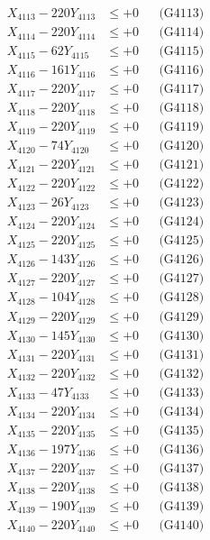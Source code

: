 \documentclass[a4paper,10pt]{article}
\begin{document}
{\begin{align}
X_{4113} - 220Y_{4113} &\leq +0 && \text{(G4113)} \\
X_{4114} - 220Y_{4114} &\leq +0 && \text{(G4114)} \\
X_{4115} - 62Y_{4115} &\leq +0 && \text{(G4115)} \\
X_{4116} - 161Y_{4116} &\leq +0 && \text{(G4116)} \\
X_{4117} - 220Y_{4117} &\leq +0 && \text{(G4117)} \\
X_{4118} - 220Y_{4118} &\leq +0 && \text{(G4118)} \\
X_{4119} - 220Y_{4119} &\leq +0 && \text{(G4119)} \\
X_{4120} - 74Y_{4120} &\leq +0 && \text{(G4120)} \\
\allowbreak
X_{4121} - 220Y_{4121} &\leq +0 && \text{(G4121)} \\
X_{4122} - 220Y_{4122} &\leq +0 && \text{(G4122)} \\
X_{4123} - 26Y_{4123} &\leq +0 && \text{(G4123)} \\
X_{4124} - 220Y_{4124} &\leq +0 && \text{(G4124)} \\
X_{4125} - 220Y_{4125} &\leq +0 && \text{(G4125)} \\
X_{4126} - 143Y_{4126} &\leq +0 && \text{(G4126)} \\
X_{4127} - 220Y_{4127} &\leq +0 && \text{(G4127)} \\
X_{4128} - 104Y_{4128} &\leq +0 && \text{(G4128)} \\
X_{4129} - 220Y_{4129} &\leq +0 && \text{(G4129)} \\
X_{4130} - 145Y_{4130} &\leq +0 && \text{(G4130)} \\
\allowbreak
X_{4131} - 220Y_{4131} &\leq +0 && \text{(G4131)} \\
X_{4132} - 220Y_{4132} &\leq +0 && \text{(G4132)} \\
X_{4133} - 47Y_{4133} &\leq +0 && \text{(G4133)} \\
X_{4134} - 220Y_{4134} &\leq +0 && \text{(G4134)} \\
X_{4135} - 220Y_{4135} &\leq +0 && \text{(G4135)} \\
X_{4136} - 197Y_{4136} &\leq +0 && \text{(G4136)} \\
X_{4137} - 220Y_{4137} &\leq +0 && \text{(G4137)} \\
X_{4138} - 220Y_{4138} &\leq +0 && \text{(G4138)} \\
X_{4139} - 190Y_{4139} &\leq +0 && \text{(G4139)} \\
X_{4140} - 220Y_{4140} &\leq +0 && \text{(G4140)} \\

\end{align}}
\end{document}
